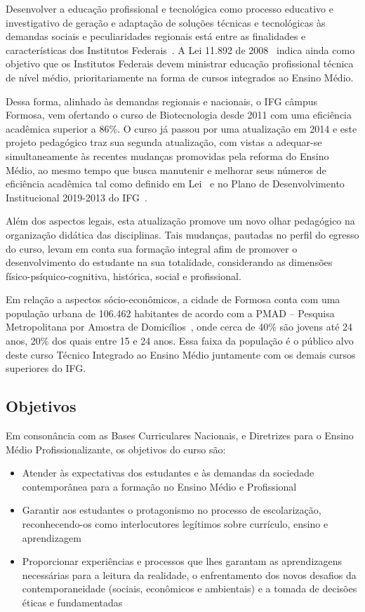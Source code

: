 \documentclass[11pt,fleqn]{book} %
\begin{document}
Desenvolver a educação profissional e tecnológica como processo educativo e investigativo de geração e adaptação de soluções técnicas e tecnológicas às demandas sociais e peculiaridades regionais está entre as finalidades e características dos Institutos Federais~\cite{Lei11892De2008}. 
A Lei 11.892 de 2008~\cite{Lei11892De2008} indica ainda como objetivo que os Institutos Federais devem ministrar educação profissional técnica de nível médio, prioritariamente na forma de cursos integrados ao Ensino Médio.

Dessa forma, alinhado às demandas regionais e nacionais, o IFG câmpus Formosa, vem ofertando o curso de Biotecnologia desde 2011 com uma eficiência acadêmica superior a 86\%.
O curso já passou por uma atualização em 2014 e este projeto pedagógico traz sua segunda atualização, com vistas a adequar-se simultaneamente às recentes mudanças promovidas pela reforma do Ensino Médio, ao mesmo tempo que busca manutenir e melhorar seus números de eficiência acadêmica tal como definido em Lei~\cite{Lei13005De2014} e no Plano de Desenvolvimento Institucional 2019-2013 do IFG~\cite{Resolucao32De2018}.

Além dos aspectos legais, esta atualização promove um novo olhar pedagógico na organização didática das disciplinas.
Tais mudanças, pautadas no perfil do egresso do curso, levam em conta sua formação integral afim de promover o desenvolvimento do estudante na sua totalidade, considerando as dimensões físico-psíquico-cognitiva, histórica, social e profissional.


Em relação a aspectos sócio-econômicos, a cidade de Formosa conta com uma população urbana de 106.462 habitantes de acordo com a PMAD – Pesquisa Metropolitana por Amostra de Domicílios~\cite{pmad2017codeplan}, onde cerca de 40\% são jovens até 24 anos, 20\% dos quais entre 15 e 24 anos. 
Essa faixa da população é o público alvo deste curso Técnico Integrado ao Ensino Médio juntamente com os demais cursos superiores do IFG.

\subsection{Objetivos}
Em consonância com as Bases Curriculares Nacionais, e Diretrizes para o Ensino Médio Profissionalizante, os objetivos do curso são:
\begin{itemize}
\item Atender às expectativas dos estudantes e às demandas da sociedade contemporânea para a formação no Ensino Médio e Profissional
\item Garantir aos estudantes o protagonismo no processo de escolarização, reconhecendo-os como interlocutores legítimos sobre currículo, ensino e aprendizagem
\item Proporcionar experiências e processos que lhes garantam as aprendizagens necessárias para a leitura da realidade, o enfrentamento dos novos desafios da contemporaneidade (sociais, econômicos e ambientais) e a tomada de decisões éticas e fundamentadas
\end{itemize}
\end{document}

